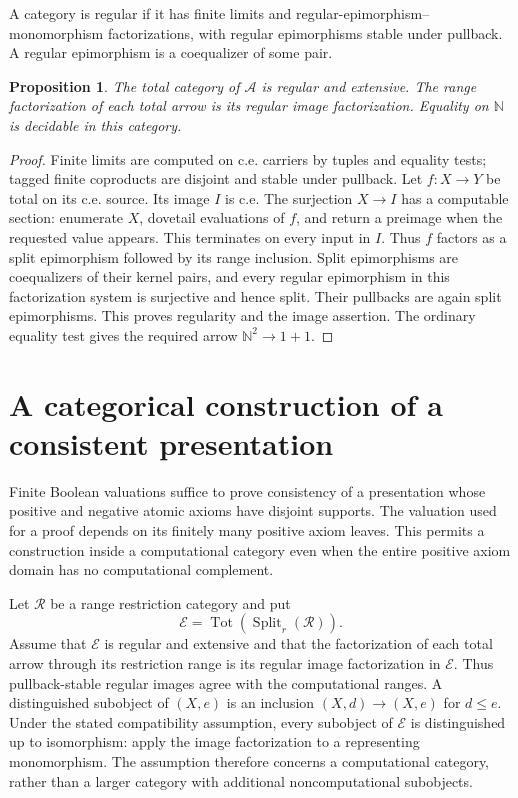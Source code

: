 \documentclass[11pt]{article}
\newtheorem{proposition}[theorem]{Proposition}
\theoremstyle{definition}
\theoremstyle{remark}
\newcommand{\R}{\mathscr R}
\newcommand{\N}{\mathbb N}
\newcommand{\Tot}{\operatorname{Tot}}
\begin{document}
A category is regular if it has finite limits and
regular-epimorphism--monomorphism factorizations, with regular
epimorphisms stable under pullback. A regular epimorphism is a
coequalizer of some pair.

\begin{proposition}\label{gen:numerical-regularity}
The total category of $\mathscr A$ is regular and extensive. The range
factorization of each total arrow is its regular image factorization.
Equality on $\N$ is decidable in this category.
\end{proposition}
\begin{proof}
Finite limits are computed on c.e. carriers by tuples and equality
tests; tagged finite coproducts are disjoint and stable under pullback.
Let $f:X\to Y$ be total on its c.e. source. Its image $I$ is c.e.
The surjection $X\to I$ has a computable section: enumerate $X$,
dovetail evaluations of $f$, and return a preimage when the requested
value appears. This terminates on every input in $I$. Thus $f$
factors as a split epimorphism followed by its range inclusion.
Split epimorphisms are coequalizers of their kernel pairs, and every
regular epimorphism in this factorization system is surjective and
hence split. Their pullbacks are again split epimorphisms. This proves
regularity and the image assertion. The ordinary equality test gives
the required arrow $\N^2\to1+1$.
\end{proof}


\section{A categorical construction of a consistent presentation}
\label{gen:consistency-section}

Finite Boolean valuations suffice to prove consistency of a presentation
whose positive and negative atomic axioms have disjoint supports. The
valuation used for a proof depends on its finitely many positive axiom
leaves. This permits a construction inside a computational category even
when the entire positive axiom domain has no computational complement.

Let $\R$ be a range restriction category and put
\[
 \mathscr E=\Tot(\operatorname{Split}_r(\R)).
\]
Assume that $\mathscr E$ is regular and extensive and that the
factorization of each total arrow through its restriction range is its
regular image factorization in $\mathscr E$. Thus pullback-stable regular
images agree with the computational ranges. A distinguished subobject
of $(X,e)$ is an inclusion $(X,d)\to(X,e)$ for $d\le e$.
Under the stated compatibility assumption, every subobject of
$\mathscr E$ is distinguished up to isomorphism: apply the image
factorization to a representing monomorphism. The assumption therefore
concerns a computational category, rather than a larger category with
additional noncomputational subobjects.
\end{document}
